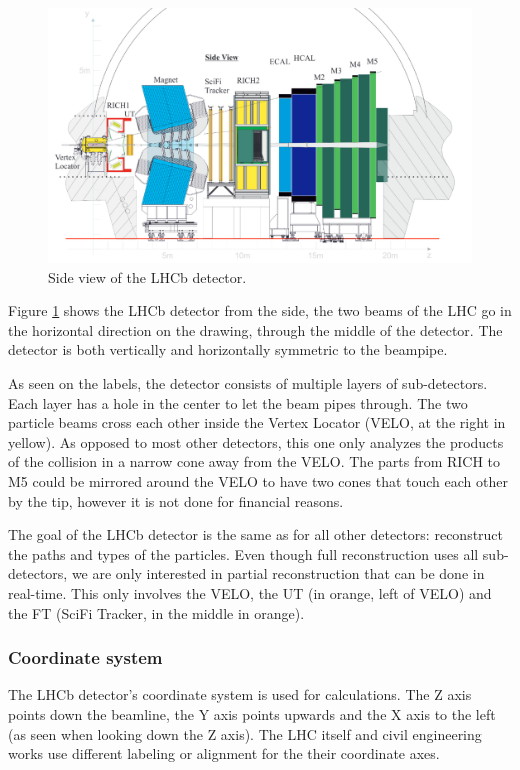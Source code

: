 \documentclass[12pt]{article}
\begin{document}
\begin{figure}[H]
	\includegraphics[width=\textwidth]{lhcb_geometry_upgrade}
	\caption{Side view of the LHCb detector.}
	\label{fig_lhcb_geometry}
\end{figure}

Figure \ref{fig_lhcb_geometry} shows the LHCb detector from the side, the two beams of the LHC go in the horizontal direction on the drawing, through the middle of the detector. The detector is both vertically and horizontally symmetric to the beampipe.

As seen on the labels, the detector consists of multiple layers of sub-detectors. Each layer has a hole in the center to let the beam pipes through. The two particle beams cross each other inside the Vertex Locator (VELO, at the right in yellow). As opposed to most other detectors, this one only analyzes the products of the collision in a narrow cone away from the VELO. The parts from RICH to M5 could be mirrored around the VELO to have two cones that touch each other by the tip, however it is not done for financial reasons.

The goal of the LHCb detector is the same as for all other detectors: reconstruct the paths and types of the particles. Even though full reconstruction uses all sub-detectors, we are only interested in partial reconstruction that can be done in real-time. This only involves the VELO, the UT (in orange, left of VELO) and the FT (SciFi Tracker, in the middle in orange).


\subsubsection{Coordinate system}\label{sec_coordinate_system}

The LHCb detector's coordinate system is used for calculations. The Z axis points down the beamline, the Y axis points upwards and the X axis to the left (as seen when looking down the Z axis). The LHC itself and civil engineering works use different labeling or alignment for the their coordinate axes.
\end{document}
